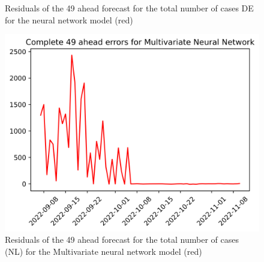 \begin{figure}
\begin{minipage}{.32\textwidth}
  \caption{Residuals of the 49 ahead forecast for the total number of cases DE for the neural network model (red)}
  \label{fig:tot_cases_error_49_nn_DE}
\end{minipage}
\begin{minipage}{.32\textwidth}
  \centering
  \includegraphics[width=\linewidth]{pics/49_ah/49_ahead_errors_Multivariate Neural Network.png}
  \caption{Residuals of the 49 ahead forecast for the total number of cases (NL) for the Multivariate neural network model (red)}
  \label{fig:tot_cases_error_49_mvnn}
\end{minipage}

\end{figure}
